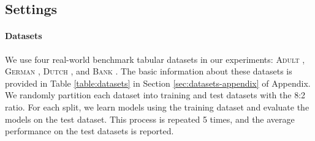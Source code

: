 \documentclass[10pt]{article} %
\begin{document}
\subsection{Settings}\label{sec:exp-settings}

\paragraph{Datasets}

We use four real-world benchmark tabular datasets in our experiments: \textsc{Adult} \citep{Dua:2019}, \textsc{German} \citep{Dua:2019}, \textsc{Dutch} \citep{dutch}, and \textsc{Bank} \citep{MORO201422}.
The basic information about these datasets is provided in Table \ref{table:datasets} in Section \ref{sec:datasets-appendix} of Appendix.
We randomly partition each dataset into training and test datasets with the 8:2 ratio.
For each split, we learn models using the training dataset and evaluate the models on the test dataset.
This process is repeated 5 times, and the average performance on the test datasets is reported.
\end{document}
